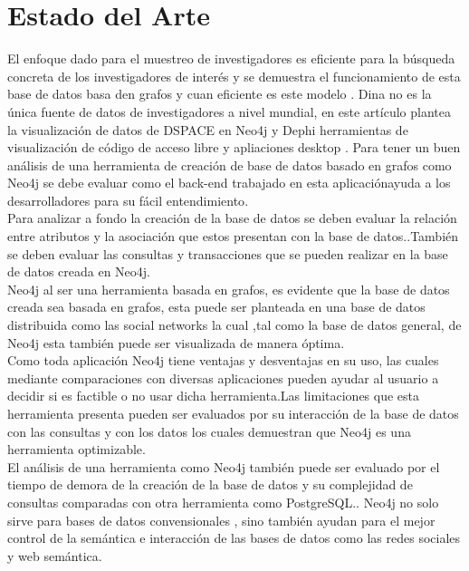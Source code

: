 \section{Estado del Arte}
El enfoque dado para el muestreo de investigadores es eficiente para la búsqueda concreta de los investigadores de interés y se demuestra el funcionamiento de esta base de datos basa den grafos y cuan eficiente es este modelo \cite{afandi2020university}.
Dina no es la única fuente de datos de investigadores a nivel mundial, en este artículo plantea la visualización de datos de DSPACE en Neo4j y Dephi herramientas de visualización de código de acceso libre y apliaciones desktop \cite{aryani2017visualising}.
Para tener un buen análisis de una herramienta de creación de base de datos basado en grafos como Neo4j se debe evaluar como el back-end trabajado en esta aplicaciónayuda a los desarrolladores para su fácil entendimiento\cite{holzschuher2013performance}.\\
Para analizar a fondo la creación de la base de datos se deben evaluar la relación entre atributos y la asociación que estos presentan con la base de datos.\cite{lu2017analysis}.También se deben evaluar las consultas y transacciones que se pueden realizar en la base de datos creada en Neo4j\cite{vukotic2015neo4j}.\\
Neo4j al ser una herramienta basada en grafos, es evidente que la base de datos creada sea basada en grafos, esta puede ser planteada en una base de datos distribuida como las social networks la cual ,tal como la base de datos general, de Neo4j esta también puede ser visualizada de manera óptima\cite{agudo2020base}.\\
Como toda aplicación Neo4j tiene ventajas y desventajas en su uso, las cuales mediante comparaciones con diversas aplicaciones pueden ayudar al usuario a decidir si es factible o no usar dicha herramienta\cite{fernandes2018graph}.Las limitaciones que esta herramienta presenta pueden ser evaluados por su interacción de la base de datos con las consultas y con los datos los cuales demuestran que Neo4j es una herramienta optimizable\cite{miller2013graph}.\\
El análisis de una herramienta como Neo4j también puede ser evaluado por el tiempo de demora de la creación de la base de datos y su complejidad de consultas comparadas con otra herramienta como PostgreSQL.\cite{stothers2020can}.
Neo4j no solo sirve para bases de datos convensionales , sino también ayudan para el mejor control de la semántica e interacción de las bases de datos como las redes sociales y web semántica\cite{guia2017graph}.

